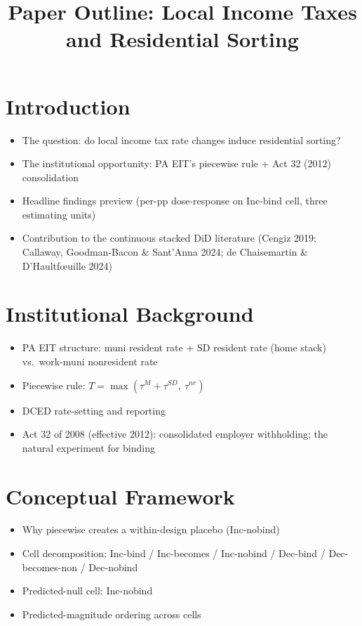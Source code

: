 \documentclass{article}
\title{Paper Outline: Local Income Taxes and Residential Sorting}
\author{}
\date{}
\begin{document}
\maketitle

\section{Introduction}
\begin{itemize}
  \item The question: do local income tax rate changes induce residential
    sorting?
  \item The institutional opportunity: PA EIT's piecewise rule + Act 32
    (2012) consolidation
  \item Headline findings preview (per-pp dose-response on Inc-bind cell,
    three estimating units)
  \item Contribution to the continuous stacked DiD literature
    (Cengiz 2019; Callaway, Goodman-Bacon \& Sant'Anna 2024;
    de Chaisemartin \& D'Haultf{\oe}uille 2024)
\end{itemize}

\section{Institutional Background}
\begin{itemize}
  \item PA EIT structure: muni resident rate + SD resident rate (home
    stack) vs.\ work-muni nonresident rate
  \item Piecewise rule:
    \( T = \max(\tau^M + \tau^{SD},\ \tau^{nr}) \)
  \item DCED rate-setting and reporting
  \item Act 32 of 2008 (effective 2012): consolidated employer
    withholding; the natural experiment for binding
\end{itemize}

\section{Conceptual Framework}
\begin{itemize}
  \item Why piecewise creates a within-design placebo (Inc-nobind)
  \item Cell decomposition:
    Inc-bind / Inc-becomes / Inc-nobind /
    Dec-bind / Dec-becomes-non / Dec-nobind
  \item Predicted-null cell: Inc-nobind
  \item Predicted-magnitude ordering across cells
\end{itemize}
\end{document}
